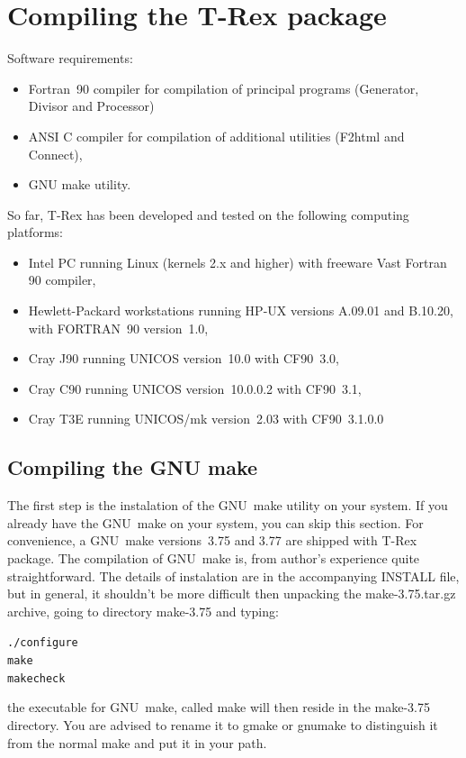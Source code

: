 \documentclass[10pt]{article}
\newcommand*{\tc}{\ttfamily} %
\newcommand*{\tn}{\sffamily} %
\begin{document}
%
    \newpage
    \section{Compiling the {\tn T-Rex} package}
%

    Software requirements:
    \begin{itemize}
      \item Fortran~90 compiler 
            for compilation of principal
            programs ({\tn Generator}, {\tn Divisor} and {\tn Processor})
      \item ANSI C compiler for compilation of additional utilities
            ({\tn F2html} and {\tn Connect}),
      \item GNU make utility. 
    \end{itemize}
%
    So far, {\tn T-Rex} has been developed and tested on the following
    computing platforms:
    \begin{itemize}
      \item Intel PC running Linux (kernels 2.x and higher)
            with freeware Vast Fortran 90 compiler,
      \item Hewlett-Packard workstations running HP-UX versions
            A.09.01 and B.10.20, with FORTRAN~90 version~1.0, 
      \item Cray J90 running UNICOS version~10.0 with CF90~3.0,
      \item Cray C90 running UNICOS version~10.0.0.2 with CF90~3.1,
      \item Cray T3E running UNICOS/mk version~2.03 with CF90~3.1.0.0
    \end{itemize}

    \subsection{Compiling the GNU make}

    The first step is the instalation of the GNU~make utility on
    your system. If you already have the GNU~make on your 
    system, you can skip this section. For convenience,
    a GNU~make versions~3.75 and 3.77 are shipped with {\tn T-Rex} 
    package.
    The compilation of GNU~make is, from author's experience
    quite straightforward. The details of instalation are in the
    accompanying INSTALL file, but in general, it shouldn't be
    more difficult then unpacking the {\tc make-3.75.tar.gz} archive,
    going to directory {\tc make-3.75} and typing:
    \begin{alltt}
    ./configure
    make 
    make check
    \end{alltt}
    the executable for GNU~make, called {\tc make} will then reside 
    in the {\tc make-3.75} directory. You are advised to rename it to
    {\tc gmake} or {\tc gnumake} to distinguish it from the
    normal make and put it in your path.
 
\end{document}
